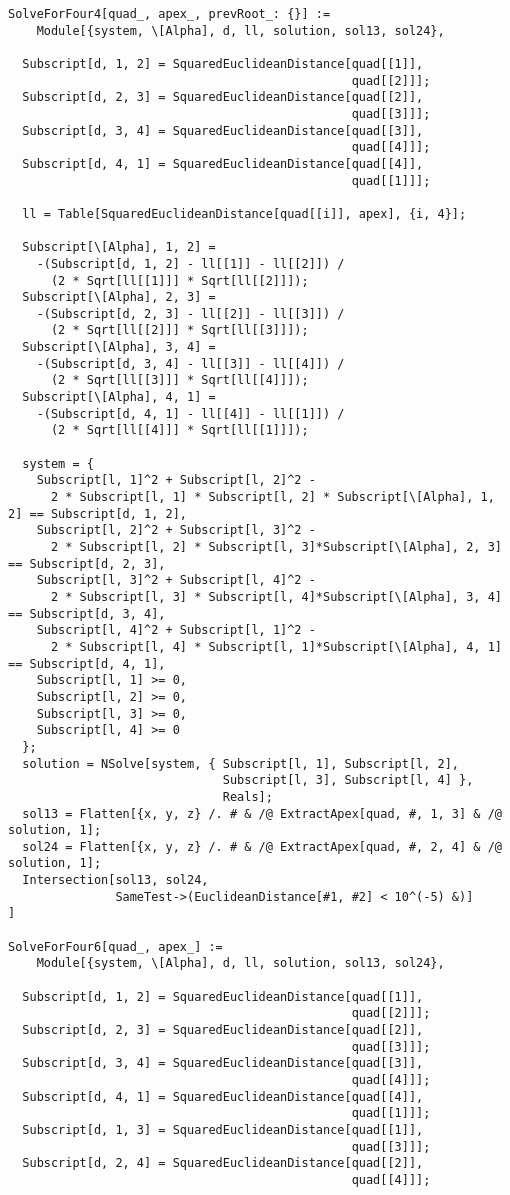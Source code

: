 \documentclass[../main.tex]{subfiles}
\begin{document}
\begin{lstlisting}
SolveForFour4[quad_, apex_, prevRoot_: {}] :=
    Module[{system, \[Alpha], d, ll, solution, sol13, sol24},

  Subscript[d, 1, 2] = SquaredEuclideanDistance[quad[[1]],
                                                quad[[2]]];
  Subscript[d, 2, 3] = SquaredEuclideanDistance[quad[[2]],
                                                quad[[3]]];
  Subscript[d, 3, 4] = SquaredEuclideanDistance[quad[[3]],
                                                quad[[4]]];
  Subscript[d, 4, 1] = SquaredEuclideanDistance[quad[[4]],
                                                quad[[1]]];

  ll = Table[SquaredEuclideanDistance[quad[[i]], apex], {i, 4}];

  Subscript[\[Alpha], 1, 2] =
    -(Subscript[d, 1, 2] - ll[[1]] - ll[[2]]) /
      (2 * Sqrt[ll[[1]]] * Sqrt[ll[[2]]]);
  Subscript[\[Alpha], 2, 3] =
    -(Subscript[d, 2, 3] - ll[[2]] - ll[[3]]) /
      (2 * Sqrt[ll[[2]]] * Sqrt[ll[[3]]]);
  Subscript[\[Alpha], 3, 4] =
    -(Subscript[d, 3, 4] - ll[[3]] - ll[[4]]) /
      (2 * Sqrt[ll[[3]]] * Sqrt[ll[[4]]]);
  Subscript[\[Alpha], 4, 1] =
    -(Subscript[d, 4, 1] - ll[[4]] - ll[[1]]) /
      (2 * Sqrt[ll[[4]]] * Sqrt[ll[[1]]]);

  system = {
    Subscript[l, 1]^2 + Subscript[l, 2]^2 -
      2 * Subscript[l, 1] * Subscript[l, 2] * Subscript[\[Alpha], 1, 2] == Subscript[d, 1, 2],
    Subscript[l, 2]^2 + Subscript[l, 3]^2 -
      2 * Subscript[l, 2] * Subscript[l, 3]*Subscript[\[Alpha], 2, 3] == Subscript[d, 2, 3],
    Subscript[l, 3]^2 + Subscript[l, 4]^2 -
      2 * Subscript[l, 3] * Subscript[l, 4]*Subscript[\[Alpha], 3, 4] == Subscript[d, 3, 4],
    Subscript[l, 4]^2 + Subscript[l, 1]^2 -
      2 * Subscript[l, 4] * Subscript[l, 1]*Subscript[\[Alpha], 4, 1] == Subscript[d, 4, 1],
    Subscript[l, 1] >= 0,
    Subscript[l, 2] >= 0,
    Subscript[l, 3] >= 0,
    Subscript[l, 4] >= 0
  };
  solution = NSolve[system, { Subscript[l, 1], Subscript[l, 2],
                              Subscript[l, 3], Subscript[l, 4] },
                              Reals];
  sol13 = Flatten[{x, y, z} /. # & /@ ExtractApex[quad, #, 1, 3] & /@ solution, 1];
  sol24 = Flatten[{x, y, z} /. # & /@ ExtractApex[quad, #, 2, 4] & /@ solution, 1];
  Intersection[sol13, sol24,
               SameTest->(EuclideanDistance[#1, #2] < 10^(-5) &)]
]

SolveForFour6[quad_, apex_] :=
    Module[{system, \[Alpha], d, ll, solution, sol13, sol24},

  Subscript[d, 1, 2] = SquaredEuclideanDistance[quad[[1]],
                                                quad[[2]]];
  Subscript[d, 2, 3] = SquaredEuclideanDistance[quad[[2]],
                                                quad[[3]]];
  Subscript[d, 3, 4] = SquaredEuclideanDistance[quad[[3]],
                                                quad[[4]]];
  Subscript[d, 4, 1] = SquaredEuclideanDistance[quad[[4]],
                                                quad[[1]]];
  Subscript[d, 1, 3] = SquaredEuclideanDistance[quad[[1]],
                                                quad[[3]]];
  Subscript[d, 2, 4] = SquaredEuclideanDistance[quad[[2]],
                                                quad[[4]]];


\end{lstlisting}
\end{document}
